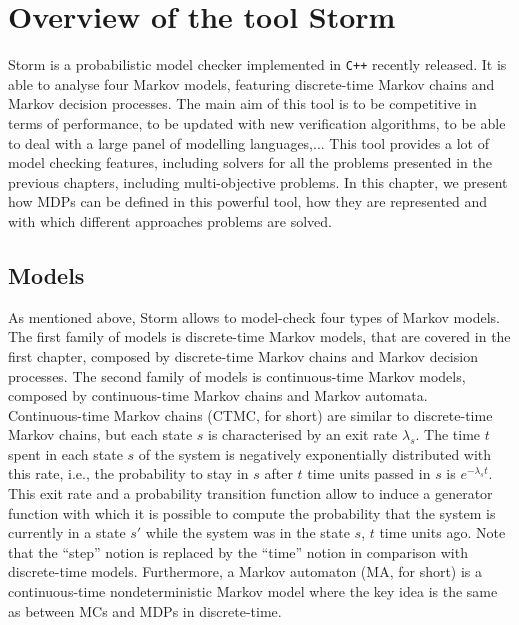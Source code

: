 \chapter{Overview of the tool Storm}\label{storm-chapter}

Storm \cite{storm1} is a probabilistic model checker implemented in \verb|C++| recently released. It is able to analyse
four Markov models, featuring discrete-time Markov chains and Markov decision processes. The main aim of this tool is to be competitive in terms of performance, to be updated with new verification algorithms, to be able to
deal with a large panel of modelling languages,... This tool provides %
a lot of model checking features, including solvers for all the problems presented in the previous chapters, including multi-objective problems.
In this chapter, we present how MDPs can be defined in this powerful tool, how they are represented and with which different approaches problems are solved.

\section{Models}
As mentioned above, Storm allows to model-check four types of Markov models.
The first family of models is discrete-time Markov models, that are covered in the first chapter, composed by
discrete-time Markov chains and Markov decision processes.
The second family of models is continuous-time Markov models, composed by continuous-time Markov chains and Markov automata. \\

Continuous-time Markov chains (CTMC, for short) \cite{maro} are similar to discrete-time Markov chains, but each state $s$ is
characterised by an exit rate $\lambda_s$.
The time $t$ spent in each state $s$ of the system is negatively exponentially distributed with this rate, i.e., the probability to stay in $s$ after $t$ time units passed in $s$ is $e^{- \lambda_s t}$.
This exit rate and a probability transition function allow to induce a generator
function with which it is possible to compute the probability
that the system is currently in a state $s'$ while the system was in the state $s$, $t$ time units ago.
Note that the ``step'' notion is replaced by the ``time'' notion in comparison with discrete-time models. Furthermore, a Markov automaton (MA, for short) is a continuous-time nondeterministic Markov model where the key idea is the same as between MCs and MDPs in discrete-time. \\

